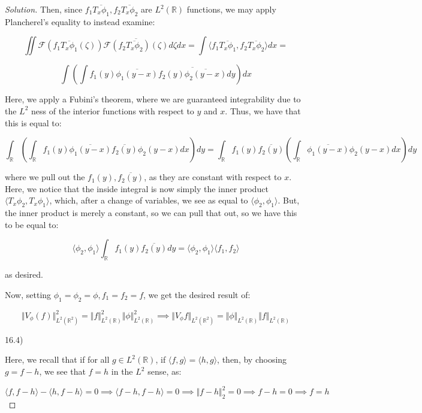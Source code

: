 \documentclass[10pt]{article}
\begin{document}
\begin{proof}[Solution]
 Then, since $ f_1 \overline{T_x \phi_1},  f_2\overline{T_x \phi_2}$ are $L^2(\mathbb{R})$ functions, we may apply Plancherel's equality to instead examine:
 
 $$  \iint \mathcal{F}( f_1 \overline{T_x \phi_1}( \zeta)) \overline{\mathcal{F}(f_2 \overline{T_x \phi_2})(\zeta)} d \zeta dx = \int \langle f_1 \overline{T_x \phi_1}, f_2 \overline{T_x \phi_2} \rangle dx = $$
 
 $$ \int \left( \int f_1(y) \overline{\phi_1(y - x)} \overline{ f_2(y) \overline{\phi_2(y-x)}} dy \right) dx $$
 
 Here, we apply a Fubini's theorem, where we are guaranteed integrability due to the $L^2$ ness of the interior functions with respect to $y$ and $x$. Thus, we have that this is equal to:
 
 $$ \int_{\mathbb{R}}\left( \int_{\mathbb{R}} f_1(y)\overline{\phi_1(y-x)} \overline{f_2(y)} \phi_2(y-x) dx \right) dy = \int_{\mathbb{R}} f_1(y) \overline{f_2(y)} \left( \int_{\mathbb{R}}\overline{\phi_1(y-x)} \phi_2(y-x) dx \right) dy$$
 
 where we pull out the $f_1(y), \overline{f_2(y)}$, as they are constant with respect to $x$. Here, we notice that the inside integral is now simply the inner product $ \langle T_x \phi_2, T_x \phi_1 \rangle$, which, after a change of variables, we see as equal to $\langle \phi_2, \phi_1 \rangle$. But, the inner product is merely a constant, so we can pull that out, so we have this to be equal to:
 
 $$ \langle \phi_2, \phi_1 \rangle \int_{\mathbb{R}} f_1(y)\overline{f_2(y)} dy = \langle \phi_2, \phi_1 \rangle  \langle f_1, f_2 \rangle $$
 
 as desired.
 
 Now, setting $\phi_1 = \phi_2 = \phi, f_1 = f_2 = f$, we get the desired result of:
 
 $$\Vert V_\phi(f) \Vert_{L^2(\mathbb{R}^2)}^2 = \Vert f \Vert_{L^2(\mathbb{R})}^2  \Vert \phi \Vert_{L^2(\mathbb{R})}^2  \implies  \Vert V_\phi f \Vert_{L^2(\mathbb{R}^2)} = \Vert \phi \Vert_{L^2(\mathbb{R})} \Vert f \Vert_{L^2(\mathbb{R})}$$
 
16.4)

Here, we recall that if for all $g \in L^2(\mathbb{R})$, if $\langle f, g \rangle = \langle h, g \rangle$, then, by choosing $g = f - h$, we see that $f = h$ in the $L^2$ sense, as:

$$ \langle f, f - h \rangle - \langle h, f - h \rangle = 0 \implies \langle f - h, f -h \rangle = 0 \implies \Vert f- h \Vert_2^2 = 0 \implies f - h= 0 \implies f = h$$


\end{proof}
\end{document}
